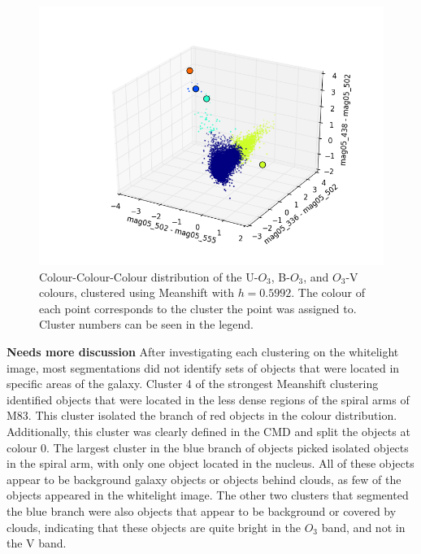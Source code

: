 \begin{figure}
\centering
\includegraphics[width=\linewidth]{figs/unsuccessful/meanshift_3d_color_5cl_mag05_502-mag05_555vsmag05_336-mag05_502vsmag05_438-mag05_502}
\caption{Colour-Colour-Colour distribution of the U-$O_{3}$, B-$O_{3}$, and $O_{3}$-V colours, clustered using Meanshift with $h=0.5992$. The colour of each point corresponds to the cluster the point was assigned to. Cluster numbers can be seen in the legend.}
\label{fig:fig:OIIIVMS3d}
\end{figure}

\textbf{Needs more discussion}
After investigating each clustering on the whitelight image, most segmentations did not identify sets of objects that were located in specific areas of the galaxy.
Cluster 4 of the strongest Meanshift clustering identified objects that were located in the less dense regions of the spiral arms of M83.
This cluster isolated the branch of red objects in the colour distribution.
Additionally, this cluster was clearly defined in the CMD and split the objects at colour 0.
The largest cluster in the blue branch of objects picked isolated objects in the spiral arm, with only one object located in the nucleus.
All of these objects appear to be background galaxy objects or objects behind clouds, as few of the objects appeared in the whitelight image.
The other two clusters that segmented the blue branch were also objects that appear to be background or covered by clouds, indicating that these objects are quite bright in the $O_{3}$ band, and not in the V band.

